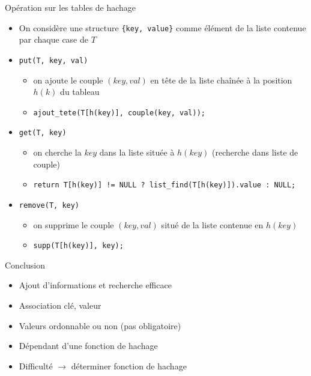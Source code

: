 \documentclass{beamer}
\begin{document}
  \begin{frame}{Opération sur les tables de hachage}
    \begin{itemize}
      \item{On considère une structure \texttt{\{key, value\}} comme élément de la liste contenue par chaque case de $T$}
      \item{\texttt{put(T, key, val)}}
      \begin{itemize}
        \item{on ajoute le couple $(key, val)$ en tête de la liste chaînée à la position $h(k)$ du tableau}
        \item{\texttt{ajout\_tete(T[h(key)], couple(key, val));}}
      \end{itemize}
      \item{\texttt{get(T, key)}}
      \begin{itemize}
        \item{on cherche la $key$ dans la liste située à $h(key)$ (recherche dans liste de couple)}
        \item{\texttt{return T[h(key)] != NULL ? list\_find(T[h(key)]).value : NULL;}}
      \end{itemize}
      \item{\texttt{remove(T, key)}}
      \begin{itemize}
        \item{on supprime le couple $(key, val)$ situé de la liste contenue en $h(key)$}
        \item{\texttt{supp(T[h(key)], key);}}
      \end{itemize}
    \end{itemize}
  \end{frame}

  \begin{frame}{Conclusion}
    \begin{itemize}
      \item{Ajout d'informations et recherche efficace}
      \item{Association clé, valeur}
      \item{Valeurs ordonnable ou non (pas obligatoire)}
      \item{Dépendant d'une fonction de hachage}
      \item{Difficulté $\rightarrow$ déterminer fonction de hachage}
    \end{itemize}
  \end{frame}
\end{document}
